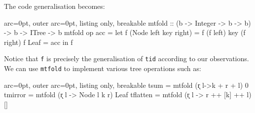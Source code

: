 The code generalisation becomes:


\begin{tcblisting}{ arc=0pt, outer arc=0pt, listing only, breakable}
mtfold :: (b -> Integer -> b -> b) -> b -> ITree -> b
mtfold op acc = 
    let f (Node left key right) = f (f left) key (f right)
        f Leaf = acc
    in f

\end{tcblisting}


Notice that \texttt{f} is precisely the generalisation of \texttt{tid} according to our observations. We can use \texttt{mtfold} to implement various tree operations such as:


\begin{tcblisting}{ arc=0pt, outer arc=0pt, listing only, breakable}
tsum = mtfold (\k r l->k + r + l) 0 
tmirror = mtfold (\k r l -> Node l k r) Leaf 
tflatten = mtfold (\k r l -> r ++ [k] ++ l) [] 

\end{tcblisting}
 